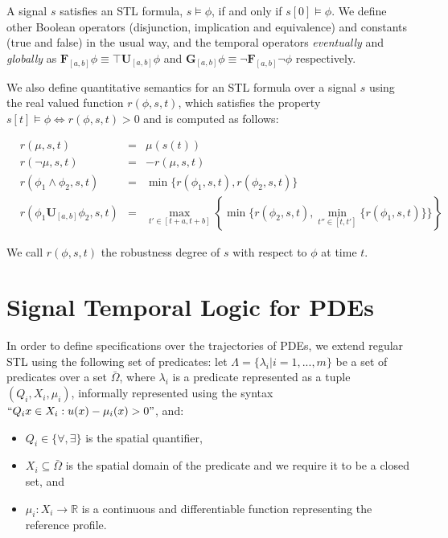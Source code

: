 \documentclass[oribibl]{llncs/llncs}
\newcommand*{\R}{\mathbb{R}}
\newcommand{\Always}{\mathbf{G}}
\newcommand{\Event}{\mathbf{F}}
\newcommand{\luntil}{\mathbf{U}}
\begin{document}
A signal $s$ satisfies an STL formula, $s \models \phi$, if and
only if $s[0] \models \phi$. We define other Boolean operators (disjunction,
implication and equivalence) and constants (true and false) in the usual way, 
and the temporal operators
\emph{eventually} and \emph{globally} as $\Event_{[a, b]} \phi \equiv \top
\luntil_{[a,b]} \phi$ and $\Always_{[a, b]} \phi \equiv \lnot \Event_{[a,b]}
\lnot \phi$ respectively.

We also define quantitative semantics for an STL formula over a signal $s$
using the real valued function $r(\phi, s, t)$, which satisfies the property $s[t]
\models \phi \iff r(\phi,s, t) > 0$ and is computed as follows:

\begin{equation}
    \begin{aligned}
        &r(\mu, s, t) &= &\mu(s(t)) \\
        &r(\lnot \mu, s, t) &= &-r(\mu, s,t) \\
        &r(\phi_1 \land \phi_2, s, t) &= &\min\{r(\phi_1,s, t),
    r(\phi_2,s, t)\} \\
    &r(\phi_1 \luntil_{[a,b]} \phi_2,s, t) &= 
    &\max_{t' \in [t+a, t+b]} \left \{ \min\{ r(\phi_2,s, t), 
\min_{t'' \in [t, t']}\{r(\phi_1,s, t)\}\} \right \}
    \end{aligned}
\end{equation}

We call $r(\phi,s, t)$ the robustness degree of $s$ with respect to $\phi$ at
time $t$.

\section{Signal Temporal Logic for PDEs}
\label{sec:signal_temporal_logic_for_pdes}

In order to define specifications over the trajectories of PDEs, we extend
regular STL using the following set of predicates:
let $\Lambda = \{\lambda_i | i = 1,...,m\}$ be a set of predicates over
a set $\bar\Omega$, where $\lambda_i$ is a predicate represented as a tuple $(Q_i, X_i, \mu_i)$, 
informally represented using the syntax $``Q_i x \in X_i : u(x) - \mu_i(x) >
0"$, and:

\begin{itemize}
    \item $Q_i \in \{\forall, \exists\}$ is the spatial quantifier,
    \item $X_i \subseteq \bar\Omega$ is the spatial domain of the predicate and
        we require it to be a closed set, and 
    \item $\mu_i : X_i \to \R$ is a continuous and differentiable function 
        representing the reference profile.
\end{itemize}
\end{document}

